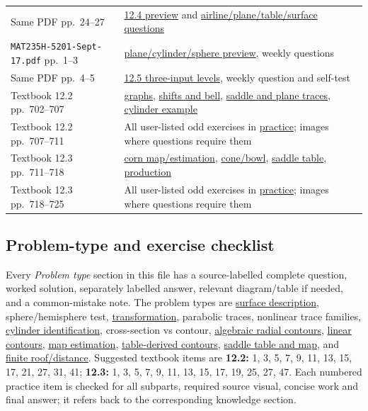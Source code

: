\begin{longtable}{p{.40\linewidth}p{.50\linewidth}}
Same PDF pp.~24--27 & \hyperref[preview]{12.4 preview} and \hyperref[weekly]{airline/plane/table/surface questions}\\
\texttt{MAT235H-5201-Sept-17.pdf} pp.~1--3 & \hyperref[preview]{plane/cylinder/sphere preview}, weekly questions\\
Same PDF pp.~4--5 & \hyperref[preview]{12.5 three-input levels}, weekly question and self-test\\
Textbook 12.2 pp.~702--707 & \hyperref[graph]{graphs}, \hyperref[transform]{shifts and bell}, \hyperref[cross]{saddle and plane traces}, \hyperref[cylinder]{cylinder example}\\
Textbook 12.2 pp.~707--711 & All user-listed odd exercises in \hyperref[textbook]{practice}; images where questions require them\\
Textbook 12.3 pp.~711--718 & \hyperref[estimate]{corn map/estimation}, \hyperref[radial]{cone/bowl}, \hyperref[saddle]{saddle table}, \hyperref[supplement]{production}\\
Textbook 12.3 pp.~718--725 & All user-listed odd exercises in \hyperref[textbook]{practice}; images where questions require them\\
\bottomrule\end{longtable}\normalsize

\subsection{Problem-type and exercise checklist}
Every \emph{Problem type} section in this file has a source-labelled complete question, worked solution, separately labelled answer, relevant diagram/table if needed, and a common-mistake note. The problem types are \hyperref[surface]{surface description}, sphere/hemisphere test, \hyperref[transform]{transformation}, parabolic traces, nonlinear trace families, \hyperref[cylinder]{cylinder identification}, cross-section vs contour, \hyperref[radial]{algebraic radial contours}, \hyperref[plane]{linear contours}, \hyperref[estimate]{map estimation}, \hyperref[table]{table-derived contours}, \hyperref[saddle]{saddle table and map}, and \hyperref[tent]{finite roof/distance}. Suggested textbook items are \textbf{12.2:} 1, 3, 5, 7, 9, 11, 13, 15, 17, 21, 27, 31, 41; \textbf{12.3:} 1, 3, 5, 7, 9, 11, 13, 15, 17, 19, 25, 27, 47. Each numbered practice item is checked for all subparts, required source visual, concise work and final answer; it refers back to the corresponding knowledge section.

